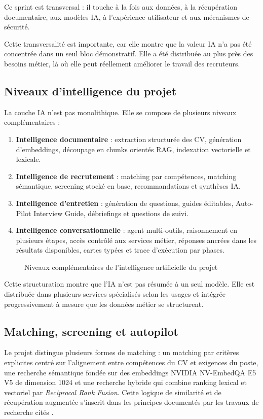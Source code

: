 Ce sprint est transversal : il touche à la fois aux données, à la récupération documentaire, aux modèles IA, à l'expérience utilisateur et aux mécanismes de sécurité.

Cette transversalité est importante, car elle montre que la valeur IA n'a pas été concentrée dans un seul bloc démonstratif. Elle a été distribuée au plus près des besoins métier, là où elle peut réellement améliorer le travail des recruteurs.

\subsection{Niveaux d'intelligence du projet}
La couche IA n'est pas monolithique. Elle se compose de plusieurs niveaux complémentaires :
\begin{enumerate}
  \item \textbf{Intelligence documentaire} : extraction structurée des CV, génération d'embeddings, découpage en chunks orientés RAG, indexation vectorielle et lexicale.
  \item \textbf{Intelligence de recrutement} : matching par compétences, matching sémantique, screening stocké en base, recommandations et synthèses IA.
  \item \textbf{Intelligence d'entretien} : génération de questions, guides éditables, Auto-Pilot Interview Guide, débriefings et questions de suivi.
  \item \textbf{Intelligence conversationnelle} : agent multi-outils, raisonnement en plusieurs étapes, accès contrôlé aux services métier, réponses ancrées dans les résultats disponibles, cartes typées et trace d'exécution par phases.
\end{enumerate}

\begin{figure}[H]
  \centering
  \caption{\label{fig:ai-levels}Niveaux complémentaires de l'intelligence artificielle du projet}
\end{figure}

Cette structuration montre que l'IA n'est pas résumée à un seul modèle. Elle est distribuée dans plusieurs services spécialisés selon les usages et intégrée progressivement à mesure que les données métier se structurent.

\subsection{Matching, screening et autopilot}
Le projet distingue plusieurs formes de matching : un matching par critères explicites centré sur l'alignement entre compétences du CV et exigences du poste, une recherche sémantique fondée sur des embeddings NVIDIA NV-EmbedQA E5 V5 de dimension 1024 et une recherche hybride qui combine ranking lexical et vectoriel par \textit{Reciprocal Rank Fusion}. Cette logique de similarité et de récupération augmentée s'inscrit dans les principes documentés par les travaux de recherche cités .


